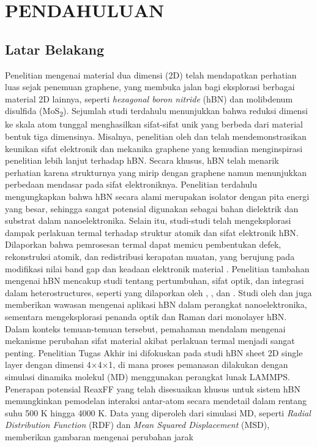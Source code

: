 \renewcommand{\thechapter}{\Roman{chapter}}
\chapter{PENDAHULUAN}
\renewcommand{\thechapter}{\arabic{chapter}}
\pagestyle{konten}


\section{Latar Belakang}
Penelitian mengenai material dua dimensi (2D) telah mendapatkan perhatian luas sejak penemuan graphene, yang membuka jalan bagi eksplorasi berbagai material 2D lainnya, seperti \textit{hexagonal boron nitride} (hBN) dan molibdenum disulfida (MoS\textsubscript{2}). Sejumlah studi terdahulu menunjukkan bahwa reduksi dimensi ke skala atom tunggal menghasilkan sifat-sifat unik yang berbeda dari material bentuk tiga dimensinya. Misalnya, penelitian oleh \citep{Novoselov2004} dan \citep{Geim2007} telah mendemonstrasikan keunikan sifat elektronik dan mekanika graphene yang kemudian menginspirasi penelitian lebih lanjut terhadap hBN. Secara khusus, hBN telah menarik perhatian karena strukturnya yang mirip dengan graphene namun menunjukkan perbedaan mendasar pada sifat elektroniknya. Penelitian terdahulu mengungkapkan bahwa hBN secara alami merupakan isolator dengan pita energi yang besar, sehingga sangat potensial digunakan sebagai bahan dielektrik dan substrat dalam nanoelektronika. Selain itu, studi-studi telah mengeksplorasi dampak perlakuan termal terhadap struktur atomik dan sifat elektronik hBN. Dilaporkan bahwa pemrosesan termal dapat memicu pembentukan defek, rekonstruksi atomik, dan redistribusi kerapatan muatan, yang berujung pada modifikasi nilai band gap dan keadaan elektronik material \citep{Zhang2020,Huang2012}. Penelitian tambahan mengenai hBN mencakup studi tentang pertumbuhan, sifat optik, dan integrasi dalam heterostructures, seperti yang dilaporkan oleh \citep{Watanabe2004}, \citep{Slotman2013}, dan \citep{Dean2010}. Studi oleh \citep{Wang2017} dan \citep{Wang2017} juga memberikan wawasan mengenai aplikasi hBN dalam perangkat nanoelektronika, sementara \citep{Elias2019} mengeksplorasi penanda optik dan Raman dari monolayer hBN. Dalam konteks temuan-temuan tersebut, pemahaman mendalam mengenai mekanisme perubahan sifat material akibat perlakuan termal menjadi sangat penting. Penelitian Tugas Akhir ini difokuskan pada studi hBN sheet 2D single layer dengan dimensi 4$\times$4$\times$1, di mana proses pemanasan dilakukan dengan simulasi dinamika molekul (MD) menggunakan perangkat lunak LAMMPS. Penerapan potensial ReaxFF yang telah disesuaikan khusus untuk sistem hBN memungkinkan pemodelan interaksi antar-atom secara mendetail dalam rentang suhu 500 K hingga 4000 K. Data yang diperoleh dari simulasi MD, seperti \textit{Radial Distribution Function} (RDF) dan \textit{Mean Squared Displacement} (MSD), memberikan gambaran mengenai perubahan jarak 